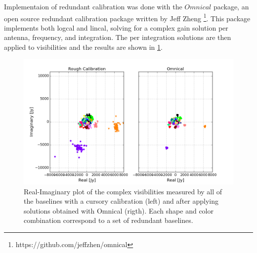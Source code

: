\documentclass[twocolumn,numberedappendix]{emulateapj} \shorttitle{PSA64}
\begin{document}
%    
%       

Implementaion of redundant calibration was done with the ${Omnical}$ package, an
open source redundant calibration package written by Jeff Zheng
\footnote{https://github.com/jeffzhen/omnical}\cite{zheng_et_al2014}. This
package implements both logcal and lincal, solving for a complex gain solution
per antenna, frequency, and integration. The per integration solutions are then
applied to visibilities and the results are shown in \ref{fig:omniview}.

\begin{figure}
\centering
\includegraphics[width=2\columnwidth]{plots/omniview_64.png}
\caption{Real-Imaginary plot of the complex visibilities measured by all of the
baselines with a cursory calibration (left) and after applying solutions
obtained with Omnical (rigth). Each shape and color combination correspond to
a set of redundant baselines. }
\label{fig:omniview}
\end{figure}
\end{document}
